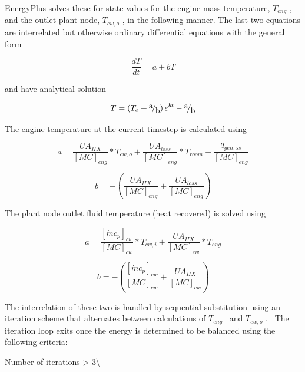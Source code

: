 EnergyPlus solves these for state values for the engine mass temperature, \({T_{eng}}\) , and the outlet plant node, \({T_{cw,o}}\) , in the following manner. The last two equations are interrelated but otherwise ordinary differential equations with the general form

\begin{equation}
\frac{{dT}}{{dt}} = a + bT
\end{equation}

and have analytical solution

\begin{equation}
T = \left( {{T_o} + {\raise0.7ex\hbox{a} \!\mathord{\left/ {\vphantom {a b}}\right.}\!\lower0.7ex\hbox{b}}} \right){e^{bt}} - {\raise0.7ex\hbox{a} \!\mathord{\left/ {\vphantom {a b}}\right.}\!\lower0.7ex\hbox{b}}
\end{equation}

The engine temperature at the current timestep is calculated using

\begin{equation}
a = \frac{{U{A_{HX}}}}{{{{[MC]}_{eng}}}}*{T_{cw,o}} + \frac{{U{A_{loss}}}}{{{{[MC]}_{eng}}}}*{T_{room}} + \frac{{{q_{gen,ss}}}}{{{{[MC]}_{eng}}}}
\end{equation}

\begin{equation}
b =  - \left( {\frac{{U{A_{HX}}}}{{{{[MC]}_{eng}}}} + \frac{{U{A_{loss}}}}{{{{[MC]}_{eng}}}}} \right)
\end{equation}

The plant node outlet fluid temperature (heat recovered) is solved using

\begin{equation}
a = \frac{{{{[\dot m{c_p}]}_{cw}}}}{{{{[MC]}_{cw}}}}*{T_{cw,i}} + \frac{{U{A_{HX}}}}{{{{[MC]}_{cw}}}}*{T_{eng}}
\end{equation}

\begin{equation}
b =  - \left( {\frac{{{{[\dot m{c_p}]}_{cw}}}}{{{{[MC]}_{cw}}}} + \frac{{U{A_{HX}}}}{{{{[MC]}_{cw}}}}} \right)
\end{equation}

The interrelation of these two is handled by sequential substitution using an iteration scheme that alternates between calculations of \({T_{eng}}\) ~and \({T_{cw,o}}\) .~ The iteration loop exits once the energy is determined to be balanced using the following criteria:

Number of iterations \textgreater{} 3\textbackslash{}

